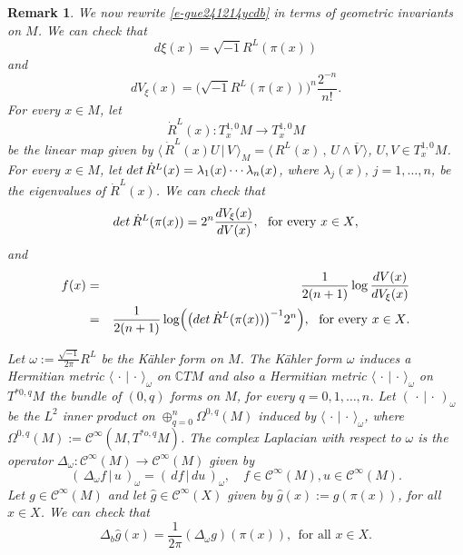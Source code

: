 \documentclass[12pt]{amsart}
\newtheorem{remark}[theorem]{Remark}
\theoremstyle{definition}
\theoremstyle{named}
\numberwithin{equation}{subsection}
\newcommand{\ol}{\overline}
\newcommand{\To}{\rightarrow}
\def\cC{\mathscr{C}}
\begin{document}
\begin{remark}
We now rewrite \eqref{e-gue241214ycdb} in terms of geometric invariants on $M$. 
We can check that 
\begin{equation}\label{e-gue241214yydIIIzz}
   d\xi(x)=\sqrt{-1}R^L(\pi(x))
   \end{equation}
   and 
   \begin{equation}\label{e-gue241214yydIIIz}
dV_\xi(x)=\Bigr(\sqrt{-1}R^L(\pi(x))\Bigr)^n\frac{2^{- n}}{n!}.
   \end{equation}
   For every $x\in M$, let 
   \[\dot{R}^L(x): T^{1,0}_xM\To T^{1,0}_xM\]
   be the linear map given by  $\langle\,\dot{R}^L(x)U\,|\,V\,\rangle_M=\langle\,R^L(x)\,,\,U\wedge\ol V\,\rangle$, $U, V\in T^{1,0}_xM$.  For every $x\in M$, let ${\rm det\,}\dot{R}^L(x)=\lambda_1(x)\cdots\lambda_n(x)$, where $\lambda_j(x)$, $j=1,\ldots,n$, be the eigenvalues of $\dot{R}^L(x)$.  We can check that 
    \begin{equation}\label{e-gue241214yydIII}
   {\rm det\,}\dot{R}^L(\pi(x))=2^n\frac{dV_\xi(x)}{dV(x)},\ \ \mbox{for every $x\in X$},
   \end{equation}
and
 \begin{eqnarray}\label{e-gue241214ycd}
   f(x)&=&\frac{1}{2(n+1)}\log \frac{dV(x)}{dV_{\xi}(x)} \nonumber \\
   &=&\frac{1}{2(n+1)}\log\Bigr(\bigr( {\rm det\,}\dot{R}^L(\pi(x))\bigr)^{-1}2^{n}\Bigr),\ \ \mbox{for every $x\in X$}.
   \end{eqnarray} 

   Let $\omega:=\frac{\sqrt{-1}}{2\pi}R^L$ be the K\"ahler form on \(M\). 
The K\"ahler form $\omega$ induces a Hermitian metric $\langle\,\cdot\,|\,\cdot\,\rangle_{\omega}$ on $\mathbb CTM$ and also a Hermitian metric $\langle\,\cdot\,|\,\cdot\,\rangle_{\omega}$ on $T^{*0,q}M$ the bundle of $(0,q)$ forms on $M$, for every $q=0,1,\ldots,n$. Let $(\,\cdot\,|\,\cdot\,)_{\omega}$ be the $L^2$ inner product on $\oplus^n_{q=0}\Omega^{0,q}(M)$ induced by $\langle\,\cdot\,|\,\cdot\,\rangle_{\omega}$, where $\Omega^{0,q}(M):=\cC^\infty(M,T^{*o,q}M)$. The complex Laplacian with respect to $\omega$ is the operator $\Delta_\omega:\cC^{\infty}(M)\rightarrow\cC^{\infty}(M)$ given by 
\begin{equation}\label{e-gue241122yydz}
(\,\Delta_\omega f\,|\,u\,)_\omega=(\,df\,|\,du\,)_{\omega},\quad f\in\cC^\infty(M), u\in\cC^{\infty}(M).\end{equation}
Let $g\in\cC^\infty(M)$ and let $\hat g\in\cC^\infty(X)$ given by $\widehat g(x):=g(\pi(x))$, for all $x\in X$. We can check that
\begin{equation}\label{e-gue241214ycdqq}
\Delta_b\widehat{g}(x)=\frac{1}{2\pi}(\Delta_\omega g)(\pi(x)),\ \ \mbox{for all $x\in X$}.
\end{equation}


\end{remark}
\end{document}
